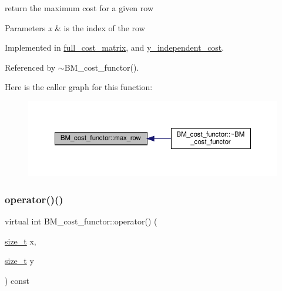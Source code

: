 return the maximum cost for a given row 


\begin{DoxyParams}{Parameters}
{\em x} & is the index of the row \\
\hline
\end{DoxyParams}


Implemented in \hyperlink{structfull__cost__matrix_a742972fc40fef6f6a007f211e18d5034}{full\+\_\+cost\+\_\+matrix}, and \hyperlink{structy__independent__cost_a9a70cf0455c1c8425279cfdcd04a6be6}{y\+\_\+independent\+\_\+cost}.



Referenced by $\sim$\+B\+M\+\_\+cost\+\_\+functor().

Here is the caller graph for this function\+:
\nopagebreak
\begin{figure}[H]
\begin{center}
\leavevmode
\includegraphics[width=350pt]{de/d28/structBM__cost__functor_a40632938a246de559ee24def934ed08d_icgraph}
\end{center}
\end{figure}
\mbox{\label{structBM__cost__functor_aa138a13f4daa2aee5b9e5b6315411bb1}} 
\subsubsection{\texorpdfstring{operator()()}{operator()()}}
{\footnotesize\ttfamily virtual int B\+M\+\_\+cost\+\_\+functor\+::operator() (\begin{DoxyParamCaption}\item[{\hyperlink{tutorial__fpt__2017_2intro_2sixth_2test_8c_a7c94ea6f8948649f8d181ae55911eeaf}{size\+\_\+t}}]{x,  }\item[{\hyperlink{tutorial__fpt__2017_2intro_2sixth_2test_8c_a7c94ea6f8948649f8d181ae55911eeaf}{size\+\_\+t}}]{y }\end{DoxyParamCaption}) const\hspace{0.3cm}{\ttfamily [pure virtual]}}



